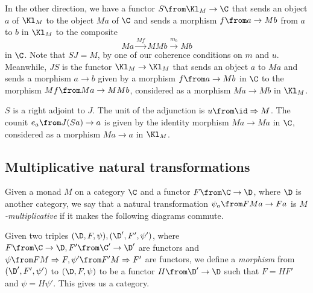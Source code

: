 In the other direction, we have a functor $ S \from \Kl_M \to \C$ that sends an object $a$ of $\Kl_M$ to the object $Ma$ of $\C$ and sends a morphism $f\from a \to M b$ from $a$ to $b$ in $\Kl_M$ to the composite
\[
  Ma \xrightarrow{M f}
  MMb \xrightarrow{m_b}
  Mb
  \]
in $\C$.  
Note that $ S J=M$, by one of our coherence conditions on $m$ and $u$.
Meanwhile, $J S $ is the functor $\Kl_M\to\Kl_M$ that sends an object $a$ to $Ma$ and sends a morphism $a\to b$ given by a morphism $f\from a \to Mb$ in $\C$ to the morphism $Mf\from Ma \to MMb$, considered as a morphism $Ma \to Mb$ in $\Kl_M$.
\begin{proposition}
  $ S $ is a right adjoint to $J$.
  The unit of the adjunction is $u\from \id \Rightarrow M$.  
  The counit $e_a\from J( S  a) \to a$ is given by the identity morphism $Ma \to Ma$ in $\C$, considered as a morphism $Ma \to a$ in $\Kl_M$.
  \label{prop:KleisliHasAdjunction}
\end{proposition}

\subsection{Multiplicative natural transformations}

Given a monad $M$ on a category $\C$ and a functor $F\from \C \to \D$, where $\D$ is another category, we say that a natural transformation $\psi_a \from FMa \to Fa$ is \emph{$M$-multiplicative} if it makes the following diagrams commute.

Given two triples $(\D, F,\psi), (\D', F',\psi')$, where $F\from \C \to \D, F'\from \C'\to\D'$ are functors and $\psi\from FM\Rightarrow F, \psi'\from F'M\Rightarrow F'$ are functors, we define a \emph{morphism} from $(\D', F',\psi')$ to $(\D, F, \psi)$ to be a functor $H\from \D' \to \D$ such that $F=HF'$ and $\psi=H\psi'$.  
This gives us a category.


